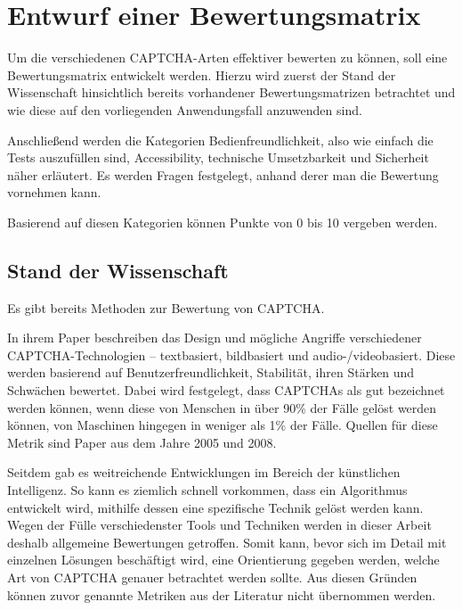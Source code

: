 \chapter{Entwurf einer Bewertungsmatrix}
\label{ch:matrix}

Um die verschiedenen CAPTCHA-Arten effektiver bewerten zu können, soll eine Bewertungsmatrix entwickelt werden.
Hierzu wird zuerst der Stand der Wissenschaft hinsichtlich bereits vorhandener Bewertungsmatrizen betrachtet
und wie diese auf den vorliegenden Anwendungsfall anzuwenden sind.

Anschließend werden die Kategorien Bedienfreundlichkeit, also wie einfach die Tests auszufüllen sind, Accessibility, technische Umsetzbarkeit
und Sicherheit näher erläutert.
Es werden Fragen festgelegt, anhand derer man die Bewertung vornehmen kann.

Basierend auf diesen Kategorien können Punkte von 0 bis 10 vergeben werden.

\section{Stand der Wissenschaft}
\label{ch:matrix:sdw}

Es gibt bereits Methoden zur Bewertung von CAPTCHA.

In ihrem Paper  beschreiben \citeauthor{surveyofresearch} das Design
und mögliche Angriffe verschiedener CAPTCHA-Technologien – textbasiert, bildbasiert und audio-/videobasiert.
Diese werden basierend auf Benutzerfreundlichkeit, Stabilität, ihren Stärken und Schwächen bewertet.  
Dabei wird festgelegt, dass CAPTCHAs als gut bezeichnet werden können, wenn diese von Menschen in über 90\% der Fälle gelöst werden können,
von Maschinen hingegen in weniger als 1\% der Fälle.
Quellen für diese Metrik sind Paper aus dem Jahre 2005 und 2008. \cite[p.75]{surveyofresearch}

Seitdem gab es weitreichende Entwicklungen im Bereich der künstlichen Intelligenz.
So kann es ziemlich schnell vorkommen, dass ein Algorithmus entwickelt wird, mithilfe dessen eine spezifische Technik gelöst werden kann.
Wegen der Fülle verschiedenster Tools und Techniken werden in dieser Arbeit deshalb allgemeine Bewertungen getroffen.
Somit kann, bevor sich im Detail mit einzelnen Lösungen beschäftigt wird, eine Orientierung gegeben werden, welche Art von CAPTCHA genauer betrachtet werden sollte.
Aus diesen Gründen können zuvor genannte Metriken aus der Literatur nicht übernommen werden.

